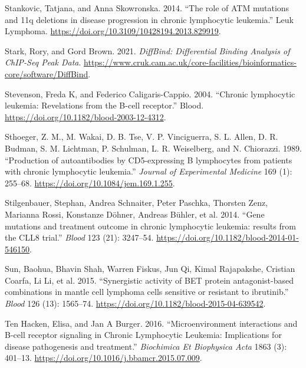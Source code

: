 \documentclass[11pt, a4paper, twosided]{book}
\newenvironment{CSLReferences}%
  {}%
  {\par}
\begin{document}
\begin{CSLReferences}{1}{0}
\leavevmode{}%
Stankovic, Tatjana, and Anna Skowronska. 2014. {``{The role of ATM mutations and 11q deletions in disease progression in chronic lymphocytic leukemia}.''} Leuk Lymphoma. \url{https://doi.org/10.3109/10428194.2013.829919}.

\leavevmode{}%
Stark, Rory, and Gord Brown. 2021. \emph{DiffBind: Differential Binding Analysis of ChIP-Seq Peak Data}. \url{https://www.cruk.cam.ac.uk/core-facilities/bioinformatics-core/software/DiffBind}.

\leavevmode{}%
Stevenson, Freda K, and Federico Caligaris-Cappio. 2004. {``{Chronic lymphocytic leukemia: Revelations from the B-cell receptor}.''} Blood. \url{https://doi.org/10.1182/blood-2003-12-4312}.

\leavevmode{}%
Sthoeger, Z. M., M. Wakai, D. B. Tse, V. P. Vinciguerra, S. L. Allen, D. R. Budman, S. M. Lichtman, P. Schulman, L. R. Weiselberg, and N. Chiorazzi. 1989. {``{Production of autoantibodies by CD5-expressing B lymphocytes from patients with chronic lymphocytic leukemia}.''} \emph{Journal of Experimental Medicine} 169 (1): 255--68. \url{https://doi.org/10.1084/jem.169.1.255}.

\leavevmode{}%
Stilgenbauer, Stephan, Andrea Schnaiter, Peter Paschka, Thorsten Zenz, Marianna Rossi, Konstanze Döhner, Andreas Bühler, et al. 2014. {``{Gene mutations and treatment outcome in chronic lymphocytic leukemia: results from the CLL8 trial.}''} \emph{Blood} 123 (21): 3247--54. \url{https://doi.org/10.1182/blood-2014-01-546150}.

\leavevmode{}%
Sun, Baohua, Bhavin Shah, Warren Fiskus, Jun Qi, Kimal Rajapakshe, Cristian Coarfa, Li Li, et al. 2015. {``{Synergistic activity of BET protein antagonist-based combinations in mantle cell lymphoma cells sensitive or resistant to ibrutinib}.''} \emph{Blood} 126 (13): 1565--74. \url{https://doi.org/10.1182/blood-2015-04-639542}.

\leavevmode{}%
Ten Hacken, Elisa, and Jan A Burger. 2016. {``{Microenvironment interactions and B-cell receptor signaling in Chronic Lymphocytic Leukemia: Implications for disease pathogenesis and treatment.}''} \emph{Biochimica Et Biophysica Acta} 1863 (3): 401--13. \url{https://doi.org/10.1016/j.bbamcr.2015.07.009}.


\end{CSLReferences}
\end{document}
